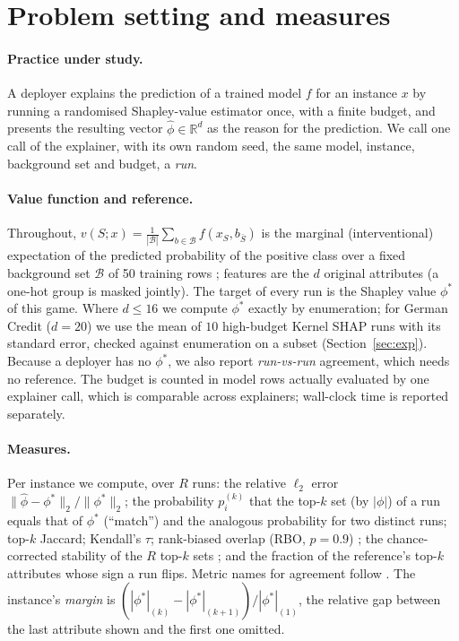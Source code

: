 \section{Problem setting and measures}
\label{sec:method}
\paragraph{Practice under study.}
A deployer explains the prediction of a trained model $f$ for an instance $x$ by running a randomised Shapley-value estimator once, with a finite budget, and presents the resulting vector $\hat\phi\in\mathbb{R}^d$ as the reason for the prediction. We call one call of the explainer, with its own random seed, the same model, instance, background set and budget, a \emph{run}.

\paragraph{Value function and reference.}
Throughout, $v(S;x)=\frac1{|\mathcal B|}\sum_{b\in\mathcal B} f(x_S,b_{\bar S})$ is the marginal (interventional) expectation of the predicted probability of the positive class over a fixed background set $\mathcal B$ of 50 training rows \citep{chen2020true}; features are the $d$ original attributes (a one-hot group is masked jointly). The target of every run is the Shapley value $\phi^\ast$ of this game. Where $d\le16$ we compute $\phi^\ast$ exactly by enumeration; for German Credit ($d=20$) we use the mean of $10$ high-budget Kernel SHAP runs with its standard error, checked against enumeration on a subset (Section~\ref{sec:exp}). Because a deployer has no $\phi^\ast$, we also report \emph{run-vs-run} agreement, which needs no reference. The budget is counted in model rows actually evaluated by one explainer call, which is comparable across explainers; wall-clock time is reported separately.

\paragraph{Measures.}
Per instance we compute, over $R$ runs: the relative $\ell_2$ error $\lVert\hat\phi-\phi^\ast\rVert_2/\lVert\phi^\ast\rVert_2$; the probability $p_i^{(k)}$ that the top-$k$ set (by $|\phi|$) of a run equals that of $\phi^\ast$ (``match'') and the analogous probability for two distinct runs; top-$k$ Jaccard; Kendall's $\tau$; rank-biased overlap (RBO, $p=0.9$) \citep{webber2010rbo}; the chance-corrected stability of the $R$ top-$k$ sets \citep{nogueira2018stability}; and the fraction of the reference's top-$k$ attributes whose sign a run flips. Metric names for agreement follow \citet{krishna2022disagreement}. The instance's \emph{margin} is $(|\phi^\ast|_{(k)}-|\phi^\ast|_{(k+1)})/|\phi^\ast|_{(1)}$, the relative gap between the last attribute shown and the first one omitted.

